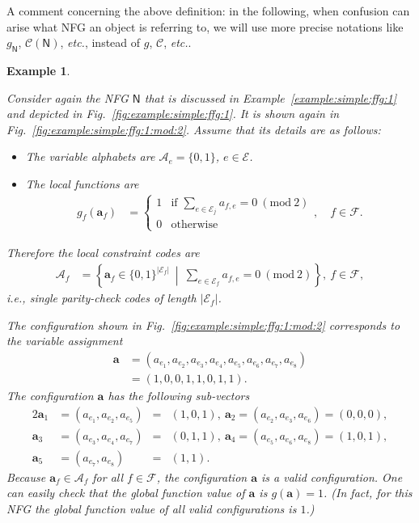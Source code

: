 \documentclass[journal, twocolumn]{IEEEtran}
\renewcommand{\mathbf}[1]{{\bm{#1}}}
\newcommand{\ie}{\emph{i.e.}}
\newcommand{\etc}{\emph{etc.}}
\newcommand{\vect}[1]{\mathbf{#1}}
\newcommand{\code}[1]{\mathcal{#1}}
\newcommand{\set}[1]{\mathcal{#1}}
\newcommand{\graph}[1]{\mathsf{#1}}
\newcommand{\codeCedge}{\code{C}}
\newcommand{\setA}{\set{A}}
\newcommand{\setE}{\set{E}}
\newcommand{\setF}{\set{F}}
\newcommand{\va}{\vect{a}}
\newcommand{\graphN}{\graph{N}}
\newcommand{\?}{\mathrm{?}}
\newtheorem{Example}[Lemma]{Example}
\begin{document}
A comment concerning the above definition: in the following, when confusion
can arise what NFG an object is referring to, we will use more
precise notations like $g_{\graphN}$, $\codeCedge(\graphN)$, \etc, instead of
$g$, $\codeCedge$, \etc.


\begin{Example}
  \label{example:simple:ffg:1:cont:0}

  Consider again the NFG $\graphN$ that is discussed in
  Example~\ref{example:simple:ffg:1} and depicted in
  Fig.~\ref{fig:example:simple:ffg:1}. It is shown again in
  Fig.~\ref{fig:example:simple:ffg:1:mod:2}. Assume that its details are as
  follows:
  \begin{itemize}

  \item The variable alphabets are $\setA_e = \{ 0, 1 \}$, $e \in \setE$.

  \item The local functions are
    \begin{align*}
      g_f(\va_f)
        &= \begin{cases}
             1 & \text{if $\sum_{e \in \setE_j} a_{f,e} = 0 \ (\mathrm{mod} \ 2)$} \\
             0 & \text{otherwise}
           \end{cases},
           \quad f \in \setF.
     \end{align*}
  \end{itemize}
  Therefore the local constraint codes are
  \begin{align*}
    \setA_f
      &= \left\{
           \va_f \in \{ 0, 1 \}^{|\setE_f|}
         \
         \middle|
         \
           \sum_{e \in \setE_f}
             a_{f,e}
             = 0 \ (\mathrm{mod} \ 2)
         \right\}, \ f \in \setF,
  \end{align*}
  \ie, single parity-check codes of length $|\setE_f|$.

  The configuration shown in Fig.~\ref{fig:example:simple:ffg:1:mod:2}
  corresponds to the variable assignment
  \begin{align*}
    \va
      &= (a_{e_1}, a_{e_2}, a_{e_3}, a_{e_4}, a_{e_5}, a_{e_6}, a_{e_7}, a_{e_8}) \\
      &= (1,0,0,1,1,0,1,1).
  \end{align*}
  The configuration $\va$ has the following sub-vectors
  \begin{alignat*}{2}
    \va_1
      &\!=\! (a_{e_1}, a_{e_2}, a_{e_5})
      &  =  & (1,0,1), \ 
    \va_2
       \!=\! (a_{e_2}, a_{e_3}, a_{e_6})
       \!=\! (0,0,0), \\
    \va_3
      &\!=\! (a_{e_3}, a_{e_4}, a_{e_7})
      &  =  & (0,1,1), \ 
    \va_4
       \!=\! (a_{e_5}, a_{e_6}, a_{e_8})
       \!=\! (1,0,1), \\
    \va_5
      &\!=\!  (a_{e_7}, a_{e_8})
      &  =  & (1,1).
  \end{alignat*}
  Because $\va_f \in \setA_f$ for all $f \in \setF$, the configuration $\va$
  is a valid configuration. One can easily check that the global function
  value of $\va$ is $g(\va) = 1$. (In fact, for this NFG the global function
  value of all valid configurations is $1$.)


\end{Example}
\end{document}
